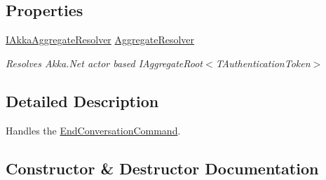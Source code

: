 \subsection*{Properties}
\begin{DoxyCompactItemize}
\item 
\hyperlink{interfaceCqrs_1_1Akka_1_1Domain_1_1IAkkaAggregateResolver}{I\+Akka\+Aggregate\+Resolver} \hyperlink{classCqrs_1_1Akka_1_1Tests_1_1Unit_1_1Commands_1_1Handlers_1_1EndConversationCommandHandler_a39a99dda0cbadd3405a4a991fd3f2163_a39a99dda0cbadd3405a4a991fd3f2163}{Aggregate\+Resolver}
\begin{DoxyCompactList}\small\item\em Resolves Akka.\+Net actor based I\+Aggregate\+Root$<$\+T\+Authentication\+Token$>$ \end{DoxyCompactList}\end{DoxyCompactItemize}


\subsection{Detailed Description}
Handles the \hyperlink{classCqrs_1_1Akka_1_1Tests_1_1Unit_1_1Commands_1_1EndConversationCommand}{End\+Conversation\+Command}. 



\subsection{Constructor \& Destructor Documentation}
\mbox{\label{classCqrs_1_1Akka_1_1Tests_1_1Unit_1_1Commands_1_1Handlers_1_1EndConversationCommandHandler_aaf3680b69f6cbad95722194c4c16cd1f_aaf3680b69f6cbad95722194c4c16cd1f}} 
